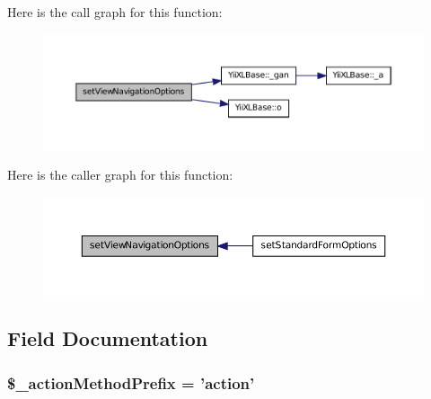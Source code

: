 Here is the call graph for this function:\nopagebreak
\begin{figure}[H]
\begin{center}
\leavevmode
\includegraphics[width=400pt]{classCXLController_a592bdbc48efc56a00e5b49582db7c09f_cgraph}
\end{center}
\end{figure}




Here is the caller graph for this function:\nopagebreak
\begin{figure}[H]
\begin{center}
\leavevmode
\includegraphics[width=396pt]{classCXLController_a592bdbc48efc56a00e5b49582db7c09f_icgraph}
\end{center}
\end{figure}




\subsection{Field Documentation}
\hypertarget{classCXLController_aa59919f08891da659e63b956bc0eb51b}{
\subsubsection[{\$\_\-actionMethodPrefix}]{\setlength{\rightskip}{0pt plus 5cm}\$\_\-actionMethodPrefix = 'action'}}
\label{classCXLController_aa59919f08891da659e63b956bc0eb51b}


